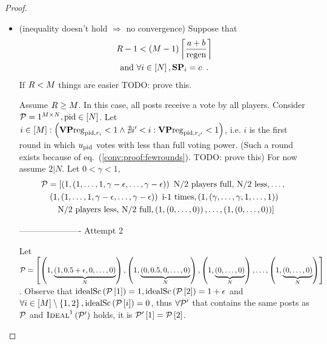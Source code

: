 \begin{proof}
\begin{itemize}
    \item (inequality doesn't hold $\Rightarrow$ no convergence) Suppose that
    \begin{gather}
      \label{conv:proof:fewrounds}
      \rounds - 1 < \left(\postlen - 1\right)\ceil*{\frac{a+b}{\regen}} \\
      \text{and } \forall i \in \left[\playerlen\right], \stpowvec_i = c
      \enspace. \nonumber
    \end{gather}
    If $R < M$ things are easier TODO: prove this.

    Assume $R \geq M$. In this case, all posts receive a vote by
    all players. Consider $\mathcal{P} = 1^{M \times N}, \mathrm{pid} \in
    \left[N\right]$. Let $i \in \left[M\right]
    :\left(\mathrm{\textbf{VP}reg}_{\mathrm{pid}, r_i} < 1 \wedge \nexists i' < i:
    \mathrm{\textbf{VP}reg}_{\mathrm{pid}, r_{i'}} < 1\right)$, i.e. $i$ is the first round in
    which $u_{\mathrm{pid}}$ votes with less than full voting power. (Such a round exists
    because of eq.~(\ref{conv:proof:fewrounds}). TODO: prove this) For now
    assume $2 | N$. Let $0 < \gamma < 1$,
    \begin{gather*}
      \mathcal{P} = \left[\left(1, \left(1, \dots, 1, \gamma - \epsilon, \dots,
      \gamma - \epsilon\right)\right) \text{ N/2 players full, N/2 less},
      \dots,\right. \\
      \left.\left(1, \left(1, \dots, 1, \gamma - \epsilon, \dots, \gamma -
      \epsilon\right)\right) \text{ i-1 times}, \left(1, \left(\gamma, \dots,
      \gamma, 1, \dots, 1\right)\right)\right.\\
      \left.\text{ N/2 players less, N/2 full},
      \left(1, \left(0, \dots, 0\right)\right), \dots, \left(1, \left(0, \dots,
      0\right)\right)\right]
    \end{gather*}

    ---------------------- Attempt 2

    Let $\mathcal{P} = \left[\left(1, \underbrace{\left(1, 0.5 + \epsilon, 0,
    \dots, 0\right)}_{N}\right), \left(1, \underbrace{\left(0, 0.5, 0,
    \dots, 0\right)}_{N}\right), \left(1, \underbrace{\left(0, \dots,
    0\right)}_{N}\right), \dots, \left(1, \underbrace{\left(0, \dots,
    0\right)}_{N}\right)\right]$. Observe that
    $\mathrm{idealSc}\left(\mathcal{P}\left[1\right]\right) = 1, \mathrm{idealSc}\left(\mathcal{P}\left[2\right]\right) = 1 +
    \epsilon$ and $\forall i \in \left[M\right] \setminus \left\{1,
    2\right\}, \mathrm{idealSc}\left(\mathcal{P}\left[i\right]\right) = 0$, thus $\forall \mathcal{P}'$
    that contains the same posts as $\mathcal{P}$ and
    $\textsc{Ideal}^1\left(\mathcal{P}'\right)$ holds, it is
    $\mathcal{P}'\left[1\right] = \mathcal{P}\left[2\right]$.


\end{itemize}
\end{proof}
